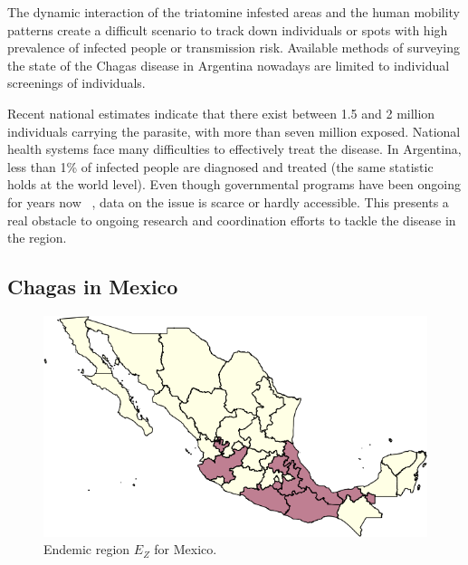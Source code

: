 The dynamic interaction of the triatomine infested areas and the human mobility patterns create a difficult scenario to track down individuals or spots with high prevalence of infected people or transmission risk. Available methods of surveying the state of the Chagas disease in Argentina nowadays are limited to individual screenings of individuals. %

Recent national estimates indicate that there exist between 1.5 and 2 million individuals carrying the parasite, with more than seven million exposed. National health systems face many difficulties to effectively treat the disease.
In Argentina, less than 1\% of infected people are diagnosed and treated
(the same statistic holds at the world level).
Even though governmental programs have been ongoing for years now~ \textcite{plan_nacional_chagas}, data on the issue is scarce or hardly accessible. This presents a real obstacle to ongoing research and coordination efforts to tackle the disease in the region.


\subsection{Chagas in  Mexico}\label{endemic_zone_mexico}


\begin{figure}[h!]
\centering
\includegraphics[width=0.75\linewidth]
{figures/Ambientes_Gran_Chaco-Mexico1/Ambientes_Gran_Chaco-Mexico1.png}
\caption{Endemic region $E_Z$ for Mexico.}
\label{fig:endemic_zone_mexico}
\end{figure}

